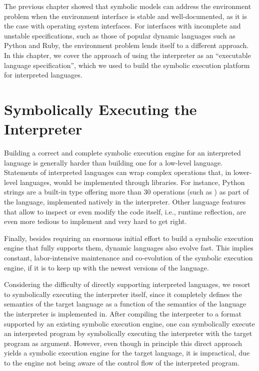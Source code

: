 The previous chapter showed that symbolic models can address the environment problem when the environment interface is stable and well-documented, as it is the case with operating system interfaces.
%
For interfaces with incomplete and unstable specifications, such as those of popular dynamic languages such as Python and Ruby, the environment problem lends itself to a different approach.
%
In this chapter, we cover the approach of using the interpreter as an ``executable language specification'', which we used to build the \chef symbolic execution platform for interpreted languages.


\section{Symbolically Executing the Interpreter}

Building a correct and complete symbolic execution engine for an interpreted language is generally harder than building one for a low-level language. 
%
Statements of interpreted languages can wrap complex operations that, in lower-level languages, would be implemented through libraries. For instance, Python strings are a built-in type offering more than 30 operations (such as ) as part of the language, implemented natively in the interpreter. 
%
Other language features that allow to inspect or even modify the code itself, i.e., runtime reflection, are even more tedious to implement and very hard to get right.

Finally, besides requiring an enormous initial effort to build a symbolic execution engine that fully supports them, dynamic languages also evolve fast. This implies constant, labor-intensive maintenance and co-evolution of the symbolic execution engine, if it is to keep up with the newest versions of the language.

Considering the difficulty of directly supporting interpreted languages, we resort to symbolically executing the interpreter itself, since it completely defines the semantics of the target language as a function of the semantics of the language the interpreter is implemented in.
%
After compiling the interpreter to a format supported by an existing symbolic execution engine, one can symbolically execute an interpreted program by symbolically executing the interpreter with the target program as argument.
%
However, even though in principle this direct approach yields a symbolic execution engine for the target language, it is impractical, due to the engine not being aware of the control flow of the interpreted program.

